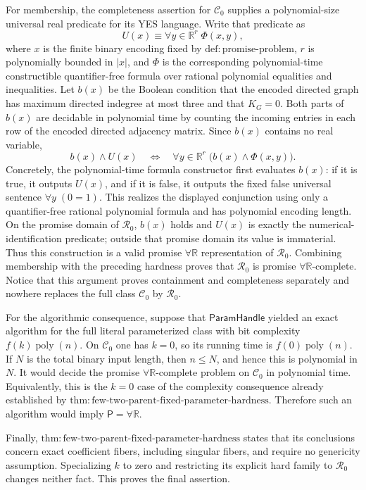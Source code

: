 For membership, the completeness assertion for \(\mathcal C_0\) supplies a polynomial-size universal real predicate for its YES language.  Write that predicate as
\[
U(x)\equiv \forall y\in\mathbb R^r\;\Phi(x,y),
\]
where \(x\) is the finite binary encoding fixed by \(\mathrm{def:promise\mbox{-}problem}\), \(r\) is polynomially bounded in \(\lvert x\rvert\), and \(\Phi\) is the corresponding polynomial-time constructible quantifier-free formula over rational polynomial equalities and inequalities.  Let \(b(x)\) be the Boolean condition that the encoded directed graph has maximum directed indegree at most three and that \(K_G=0\).  Both parts of \(b(x)\) are decidable in polynomial time by counting the incoming entries in each row of the encoded directed adjacency matrix.  Since \(b(x)\) contains no real variable,
\[
b(x)\wedge U(x)
\quad\Longleftrightarrow\quad
\forall y\in\mathbb R^r\;\bigl(b(x)\wedge\Phi(x,y)\bigr).
\]
Concretely, the polynomial-time formula constructor first evaluates \(b(x)\): if it is true, it outputs \(U(x)\), and if it is false, it outputs the fixed false universal sentence \(\forall y\;(0=1)\).  This realizes the displayed conjunction using only a quantifier-free rational polynomial formula and has polynomial encoding length.  On the promise domain of \(\mathcal R_0\), \(b(x)\) holds and \(U(x)\) is exactly the numerical-identification predicate; outside that promise domain its value is immaterial.  Thus this construction is a valid promise \(\forall\mathbb R\) representation of \(\mathcal R_0\).  Combining membership with the preceding hardness proves that \(\mathcal R_0\) is promise \(\forall\mathbb R\)-complete.  Notice that this argument proves containment and completeness separately and nowhere replaces the full class \(\mathcal C_0\) by \(\mathcal R_0\).

For the algorithmic consequence, suppose that \(\mathsf{ParamHandle}\) yielded an exact algorithm for the full literal parameterized class with bit complexity \(f(k)\operatorname{poly}(n)\).  On \(\mathcal C_0\) one has \(k=0\), so its running time is \(f(0)\operatorname{poly}(n)\).  If \(N\) is the total binary input length, then \(n\leq N\), and hence this is polynomial in \(N\).  It would decide the promise \(\forall\mathbb R\)-complete problem on \(\mathcal C_0\) in polynomial time.  Equivalently, this is the \(k=0\) case of the complexity consequence already established by \(\mathrm{thm:few\mbox{-}two\mbox{-}parent\mbox{-}fixed\mbox{-}parameter\mbox{-}hardness}\).  Therefore such an algorithm would imply \(\mathsf P=\forall\mathbb R\).

Finally, \(\mathrm{thm:few\mbox{-}two\mbox{-}parent\mbox{-}fixed\mbox{-}parameter\mbox{-}hardness}\) states that its conclusions concern exact coefficient fibers, including singular fibers, and require no genericity assumption.  Specializing \(k\) to zero and restricting its explicit hard family to \(\mathcal R_0\) changes neither fact.  This proves the final assertion.
